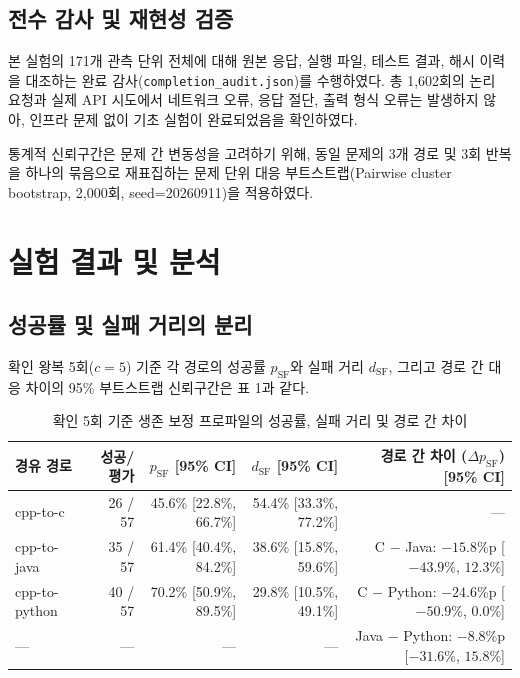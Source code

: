 \documentclass[a4paper,10pt,twocolumn,twoside]{article}
\newcommand{\psf}{p_{\mathrm{SF}}}
\newcommand{\dsf}{d_{\mathrm{SF}}}
\begin{document}
\subsection{전수 감사 및 재현성 검증}

본 실험의 171개 관측 단위 전체에 대해 원본 응답, 실행 파일, 테스트 결과, 해시 이력을 대조하는 완료 감사(\texttt{completion\_audit.json})를 수행하였다. 총 1,602회의 논리 요청과 실제 API 시도에서 네트워크 오류, 응답 절단, 출력 형식 오류는 발생하지 않아, 인프라 문제 없이 기초 실험이 완료되었음을 확인하였다.

통계적 신뢰구간은 문제 간 변동성을 고려하기 위해, 동일 문제의 3개 경로 및 3회 반복을 하나의 묶음으로 재표집하는 문제 단위 대응 부트스트랩(Pairwise cluster bootstrap, 2,000회, seed=20260911)을 적용하였다.

\section{실험 결과 및 분석}

\subsection{성공률 및 실패 거리의 분리}

확인 왕복 5회($c=5$) 기준 각 경로의 성공률 $\psf$와 실패 거리 $\dsf$, 그리고 경로 간 대응 차이의 95\% 부트스트랩 신뢰구간은 표 1과 같다.

\begin{table}[t]
\centering
\footnotesize
\setlength{\tabcolsep}{6pt}
\caption{확인 5회 기준 생존 보정 프로파일의 성공률, 실패 거리 및 경로 간 차이}
\begin{tabular}{lrrrr}
\toprule
경유 경로 & 성공/평가 & $\psf$ [95\% CI] & $\dsf$ [95\% CI] & 경로 간 차이 ($\Delta \psf$) [95\% CI] \\
\midrule
cpp-to-c & 26 / 57 & 45.6\% [22.8\%, 66.7\%] & 54.4\% [33.3\%, 77.2\%] & --- \\
cpp-to-java & 35 / 57 & 61.4\% [40.4\%, 84.2\%] & 38.6\% [15.8\%, 59.6\%] & C $-$ Java: $-15.8$\%p [$-43.9$\%, $12.3$\%] \\
cpp-to-python & 40 / 57 & 70.2\% [50.9\%, 89.5\%] & 29.8\% [10.5\%, 49.1\%] & C $-$ Python: $-24.6$\%p [$-50.9$\%, $0.0$\%] \\
--- & --- & --- & --- & Java $-$ Python: $-8.8$\%p [$-31.6$\%, $15.8$\%] \\
\bottomrule
\end{tabular}
\end{table}
\end{document}
